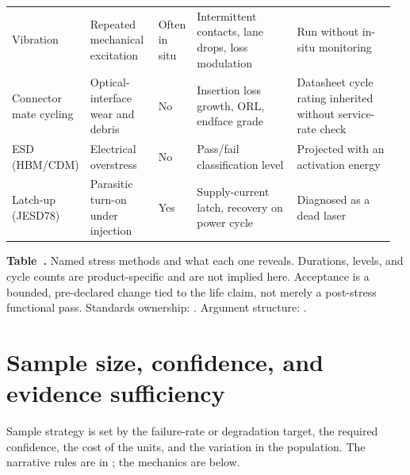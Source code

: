 \begin{table}[ht]
\begin{tabular}{@{}p{0.15\linewidth}p{0.18\linewidth}p{0.07\linewidth}p{0.28\linewidth}p{0.28\linewidth}@{}}
\addlinespace[0.6em]
Vibration & Repeated mechanical excitation & Often in situ & Intermittent contacts, lane drops, loss modulation & Run without in-situ monitoring \\
\addlinespace[0.6em]
Connector mate cycling & Optical-interface wear and debris & No & Insertion loss growth, ORL, endface grade & Datasheet cycle rating inherited without service-rate check \\
\addlinespace[0.6em]
ESD (HBM/CDM) & Electrical overstress & No & Pass/fail classification level & Projected with an activation energy \\
\addlinespace[0.6em]
Latch-up (JESD78) & Parasitic turn-on under injection & Yes & Supply-current latch, recovery on power cycle & Diagnosed as a dead laser \\
\bottomrule
\end{tabular}
\par\medskip
{\raggedright\footnotesize\textbf{Table~\thetable.} Named stress methods and
what each one reveals. Durations, levels, and cycle counts are product-specific
and are not implied here. Acceptance is a bounded, pre-declared change tied to
the life claim, not merely a post-stress functional pass. Standards ownership:
. Argument structure:
.\par}
\end{table}
\FloatBarrier

\section{Sample size, confidence, and evidence sufficiency}
\label{sec:qual-sample-reference}

Sample strategy is set by the failure-rate or degradation target, the required
confidence, the cost of the units, and the variation in the population. The
narrative rules are in ; the
mechanics are below.

